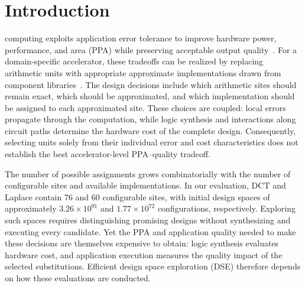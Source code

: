 \section{Introduction}
\label{sec:introduction}

 computing exploits application error tolerance to improve hardware power, performance, and area (PPA) while preserving acceptable output quality~\cite{jiang2020approxarith,que2023approxsurvey,xu2016approxsurvey}.
For a domain-specific accelerator, these tradeoffs can be realized by replacing arithmetic units with appropriate approximate implementations drawn from component libraries~\cite{mrazek2017evoapprox,ullah2018smapproxlib,mrazek2019autoax}.
The design decisions include which arithmetic sites should remain exact, which should be approximated, and which implementation should be assigned to each approximated site.
These choices are coupled: local errors propagate through the computation, while logic synthesis and interactions along circuit paths determine the hardware cost of the complete design.
Consequently, selecting units solely from their individual error and cost characteristics does not establish the best accelerator-level PPA--quality tradeoff.

The number of possible assignments grows combinatorially with the number of configurable sites and available implementations.
In our evaluation, DCT and Laplace contain 76 and 60 configurable sites, with initial design spaces of approximately $3.26\times10^{91}$ and $1.77\times10^{72}$ configurations, respectively.
Exploring such spaces requires distinguishing promising designs without synthesizing and executing every candidate.
Yet the PPA and application quality needed to make these decisions are themselves expensive to obtain: logic synthesis evaluates hardware cost, and application execution measures the quality impact of the selected substitutions.
Efficient design space exploration (DSE) therefore depends on how these evaluations are conducted.

